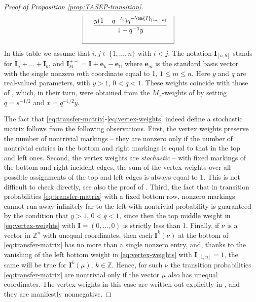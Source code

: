 \documentclass[11pt,reqno]{amsart}
\theoremstyle{definition}
\theoremstyle{remark}
\theoremstyle{remark}
\def\leq{\leqslant}
\def\I{\bm{I}}
\newcommand{\Is}[2]{\I_{[#1,#2]}}
\renewcommand\le{\leq}
\def\Z{\mathbb Z}
\numberwithin{equation}{section}
\begin{document}
\begin{proof}[Proof of Proposition \ref{prop:TASEP-transition}]
\begin{align}
\begin{tabular}{|c|c|c|}
				\quad
				$\dfrac{y(1-q^{-I_i})q^{-\Is{i+1}{n}}}{1-q^{-1} y}$
				\quad
				\\[0.7cm]
				\hline
			\end{tabular} 
		\end{align}
		In this table we assume that $i,j \in \{1,\dots,n\}$ with $i<j$. The notation $\I_{[a,b]}$ stands for $\I_a+\dots+\I_b$, and $\I^{+-}_{kl}=\I+\mathbf{e}_k-\mathbf{e}_l$, where $\mathbf{e}_m$ is the standard basis vector with the single nonzero $m$th coordinate equal to 1, $1\le m\le n$.  
		Here $y$ and $q$ are real-valued parameters, with $y>1$, $0<q<1$.
		These weights coincide with those of \cite[(3.31)]{deGier-Mead-Wheeler}, which, in their turn, were obtained from the $\widetilde M_x$-weights of \cite[(2.5.1)]{BW-coloured} by setting $q=s^{-1/2}$ and $x=q^{-1/2}y$. 
		
		The fact that \eqref{eq:transfer-matrix}-\eqref{eq:vertex-weights} indeed define a stochastic matrix follows from the following observations. First, the vertex weights preserve the number of nontrivial markings -- they are nonzero only if the number of nontrivial entries in the bottom and right markings is equal to that in the top and left ones. 
		Second, the vertex weights are \emph{stochastic} -- with fixed markings of the bottom and right incident edges, the sum of the vertex weights over all possible assignments of the top and left edges is always equal to 1. This is not difficult to check directly, see also the proof of \cite[Proposition 2.5.1]{BW-coloured}. Third, the fact that in transition probabilities \eqref{eq:transfer-matrix} with a fixed bottom row, nonzero markings cannot run away infinitely far to the left with nontrivial probability is guaranteed by the condition that $y>1$, $0<q<1$, since then the top middle weight in \eqref{eq:vertex-weights} with $\I=(0,\dots,0)$ is strictly less than 1. Finally, if $\nu$ is a vector in $\Z^n$ with unequal coordinates, then each $\I^k(\nu)$ at the bottom of \eqref{eq:transfer-matrix} has no more than a single nonzero entry, and, thanks to the vanishing of the left bottom weight in \eqref{eq:vertex-weights} with $\I_{[1,n]}=1$, the same will be true for $\I^k(\mu)$, $k\in \Z$. Hence, for such $\nu$ the transition probabilities \eqref{eq:transfer-matrix} are nontrivial only if the vector $\mu$ also has unequal coordinates. The vertex weights in this case are written out explicitly in \cite[(3.32)]{deGier-Mead-Wheeler}, and they are manifestly nonnegative.    
		

\end{proof}
\end{document}
